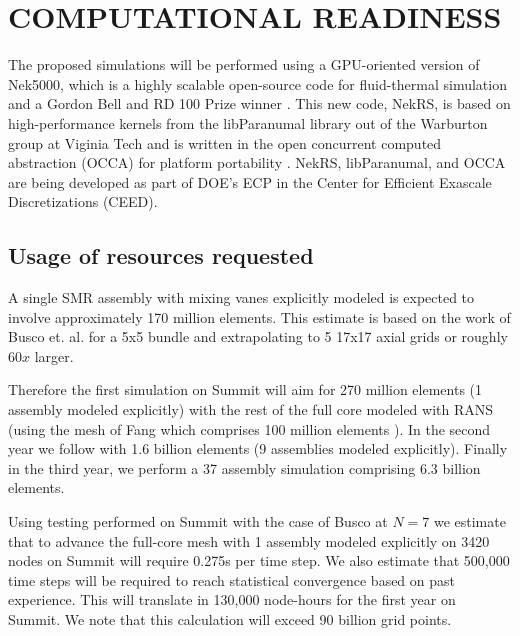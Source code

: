 \vspace{-.25in}
\section{COMPUTATIONAL READINESS} %
\vspace{-.2in}

The proposed simulations will be performed using a GPU-oriented version of
Nek5000, which is a highly scalable open-source code for fluid-thermal
simulation and a Gordon Bell and RD 100 Prize winner \cite{tufo99a}.  This new
code, NekRS, is based on high-performance kernels from the libParanumal library
out of the Warburton group at Viginia Tech
\cite{ChalmersKarakusAustinSwirydowiczWarburton2020,streamParanumal2020} and is written in
the open concurrent computed abstraction (OCCA) for platform portability
\cite{occa}.  NekRS, libParanumal, and OCCA are being developed as part of
DOE's ECP in the Center for Efficient Exascale
Discretizations (CEED). 

\vspace{-.25in}
\subsection{Usage of resources requested }
\vspace{-.2in}

A single SMR assembly with mixing vanes explicitly modeled is expected to involve
approximately 170 million elements. This estimate is based on the work of
Busco et. al. \cite{busco2019invariant} for a 5x5 bundle and extrapolating to 5 17x17 axial grids or roughly $60 x$ larger.

Therefore the first simulation on Summit will aim for 270 million elements (1 assembly modeled explicitly) with the rest of the full core modeled with RANS (using the mesh of Fang which comprises 100  million elements \cite{Fang2021}). In the second year we follow with 1.6 billion elements (9 assemblies modeled explicitly).
Finally in the third year, we perform a 37 assembly simulation comprising 6.3 billion elements.

Using testing performed on Summit with the case of Busco \cite{fischer2021nekrs} at $N=7$ we estimate that to advance the full-core mesh with 1 assembly modeled explicitly on 3420 nodes on Summit will require 0.275s per time step. We also estimate that 500,000 time steps will be required to reach statistical convergence based on past experience. This will translate in 130,000 node-hours for the first year on Summit. We note that this calculation will exceed 90 billion grid points.

